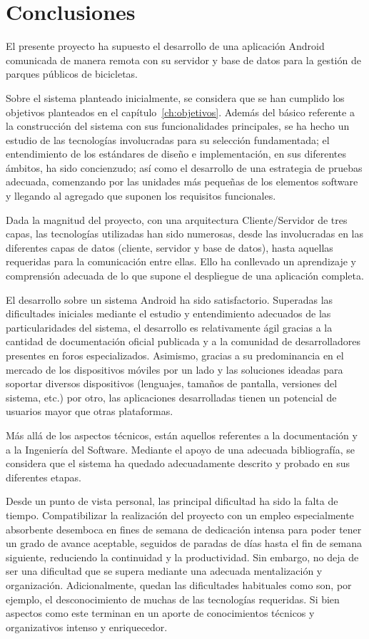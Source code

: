 \chapter{Conclusiones}

El presente proyecto ha supuesto el desarrollo de una aplicación Android comunicada de manera remota con su servidor y base de datos para la gestión de parques públicos de bicicletas.

Sobre el sistema planteado inicialmente, se considera que se han cumplido los objetivos planteados en el capítulo~\ref{ch:objetivos}. Además del básico referente a la construcción del sistema con sus funcionalidades principales, se ha hecho un estudio de las tecnologías involucradas para su selección fundamentada; el entendimiento de los estándares de diseño e implementación, en sus diferentes ámbitos, ha sido concienzudo; así como el desarrollo de una estrategia de pruebas adecuada, comenzando por las unidades más pequeñas de los elementos software y llegando al agregado que suponen los requisitos funcionales.

Dada la magnitud del proyecto, con una arquitectura Cliente/Servidor de tres capas, las tecnologías utilizadas han sido numerosas, desde las involucradas en las diferentes capas de datos (cliente, servidor y base de datos), hasta aquellas requeridas para la comunicación entre ellas. Ello ha conllevado un aprendizaje y comprensión adecuada de lo que supone el despliegue de una aplicación completa.

El desarrollo sobre un sistema Android ha sido satisfactorio. Superadas las dificultades iniciales mediante el estudio y entendimiento adecuados de las particularidades del sistema, el desarrollo es relativamente ágil gracias a la cantidad de documentación oficial publicada y a la comunidad de desarrolladores presentes en foros especializados. Asimismo, gracias a su predominancia en el mercado de los dispositivos móviles por un lado y las soluciones ideadas para soportar diversos dispositivos (lenguajes, tamaños de pantalla, versiones del sistema, etc.) por otro, las aplicaciones desarrolladas tienen un potencial de usuarios mayor que otras plataformas.

Más allá de los aspectos técnicos, están aquellos referentes a la documentación y a la Ingeniería del Software. Mediante el apoyo de una adecuada bibliografía, se considera que el sistema ha quedado adecuadamente descrito y probado en sus diferentes etapas.

Desde un punto de vista personal, las principal dificultad ha sido la falta de tiempo. Compatibilizar la realización del proyecto con un empleo especialmente absorbente desemboca en fines de semana de dedicación intensa para poder tener un grado de avance aceptable, seguidos de paradas de días hasta el fin de semana siguiente, reduciendo la continuidad y la productividad. Sin embargo, no deja de ser una dificultad que se supera mediante una adecuada mentalización y organización. Adicionalmente, quedan las dificultades habituales como son, por ejemplo, el desconocimiento de muchas de las tecnologías requeridas. Si bien aspectos como este terminan en un aporte de conocimientos técnicos y organizativos intenso y enriquecedor.

